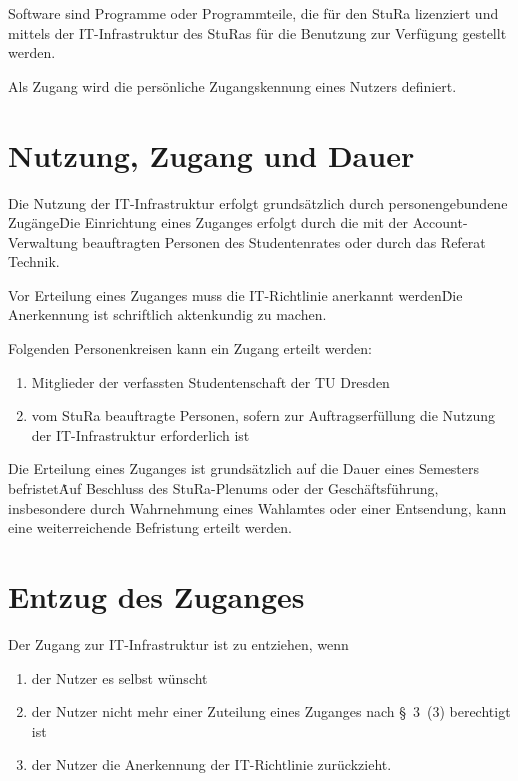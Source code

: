 \begin{multicols}{2}
\Abs \Satz Software sind Programme oder Programmteile, die für den StuRa lizenziert und mittels der IT-Infrastruktur des StuRas für die Benutzung zur Verfügung gestellt werden.

\Abs \Satz Als Zugang wird die persönliche Zugangskennung eines Nutzers definiert. 
 

\section{Nutzung, Zugang und Dauer}

\Abs \Satz Die Nutzung der IT-Infrastruktur erfolgt grundsätzlich durch personengebundene Zugänge\. Die Einrichtung eines Zuganges erfolgt durch die mit der Account-Verwaltung beauftragten Personen des Studentenrates oder durch das Referat Technik.

\Abs \Satz Vor Erteilung eines Zuganges muss die IT-Richtlinie anerkannt werden\. Die Anerkennung ist schriftlich aktenkundig zu machen. 

\Abs \Satz Folgenden Personenkreisen kann ein Zugang erteilt werden: 
\begin{enumerate}
\item Mitglieder der verfassten Studentenschaft der TU Dresden
\item vom StuRa beauftragte Personen, sofern zur Auftragserfüllung die Nutzung der IT-Infrastruktur erforderlich ist
\end{enumerate}

\Abs \Satz Die Erteilung eines Zuganges ist grundsätzlich auf die Dauer eines Semesters befristet\. Auf Beschluss des StuRa-Plenums oder der Geschäftsführung, insbesondere durch Wahrnehmung eines Wahlamtes oder einer Entsendung, kann eine weiterreichende Befristung erteilt werden. 


\section{Entzug des Zuganges}

\Abs \Satz Der Zugang zur IT-Infrastruktur ist zu entziehen, wenn 
\begin{enumerate}
\item der Nutzer es selbst wünscht
\item der Nutzer nicht mehr einer Zuteilung eines Zuganges nach §~3~(3) berechtigt ist
\item der Nutzer die Anerkennung der IT-Richtlinie zurückzieht.
\end{enumerate}
 

\end{multicols}
